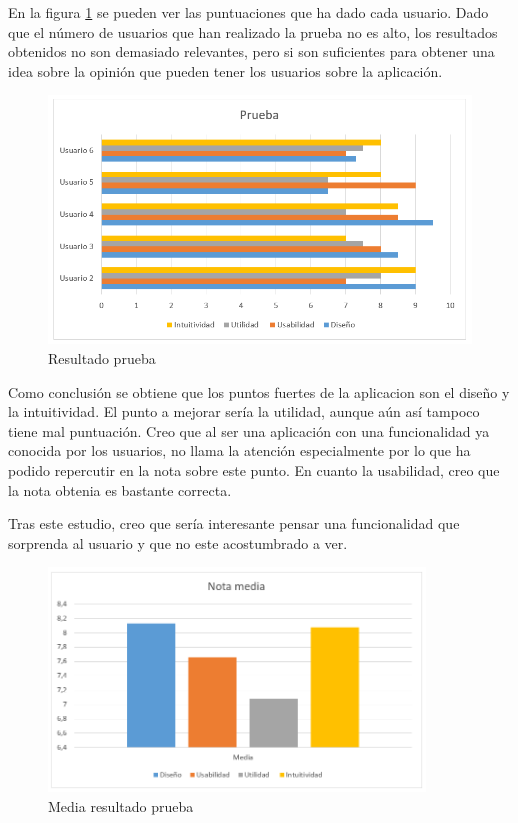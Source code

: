 \documentclass[a4paper, 12pt]{book}
\begin{document}
En la figura \ref{f:prueba_result} se pueden ver las puntuaciones que ha dado cada usuario. Dado que el n\'umero de usuarios que han realizado la prueba no es alto, los resultados obtenidos no son demasiado relevantes, pero si son suficientes para obtener una idea sobre la opini\'on que pueden tener los usuarios sobre la aplicaci\'on.

\begin{figure}[H]
  \centering
  \includegraphics[width=12cm, keepaspectratio]{img/prueba.png}
  \caption{Resultado prueba}
  \label{f:prueba_result}
\end{figure}

Como conclusi\'on se obtiene que los puntos fuertes de la aplicacion son el dise\~no y la intuitividad. El punto a mejorar ser\'ia la utilidad, aunque a\'un as\'i tampoco tiene mal puntuaci\'on. Creo que al ser una aplicaci\'on con una funcionalidad ya conocida por los usuarios, no llama la atenci\'on especialmente por lo que ha podido repercutir en la nota sobre este punto. En cuanto la usabilidad, creo que la nota obtenia es bastante correcta. 

Tras este estudio, creo que ser\'ia interesante pensar una funcionalidad que sorprenda al usuario y que no este acostumbrado a ver.

\begin{figure}[H]
  \centering
  \includegraphics[width=10cm, keepaspectratio]{img/media.png}
  \caption{Media resultado prueba}
  \label{f:prueba-media}
\end{figure}
\end{document}

